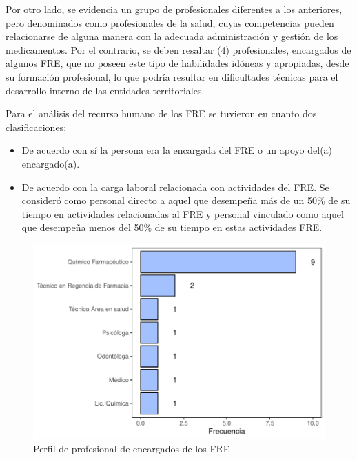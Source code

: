 \documentclass[
]{book}
\begin{document}
Por otro lado, se evidencia un grupo de profesionales diferentes a los anteriores, pero denominados como profesionales de la salud, cuyas competencias pueden relacionarse de alguna manera con la adecuada administración y gestión de los medicamentos. Por el contrario, se deben resaltar (4) profesionales, encargados de algunos FRE, que no poseen este tipo de habilidades idóneas y apropiadas, desde su formación profesional, lo que podría resultar en dificultades técnicas para el desarrollo interno de las entidades territoriales.

Para el análisis del recurso humano de los FRE se tuvieron en cuanto dos clasificaciones:

\begin{itemize}
\item
  De acuerdo con sí la persona era la encargada del FRE o un apoyo del(a) encargado(a).
\item
  De acuerdo con la carga laboral relacionada con actividades del FRE. Se consideró como personal directo a aquel que desempeña más de un 50\% de su tiempo en actividades relacionadas al FRE y personal vinculado como aquel que desempeña menos del 50\% de su tiempo en estas actividades FRE.
\end{itemize}

\begin{figure}

{\centering \includegraphics[width=1\linewidth]{InformeFinal_files/figure-latex/perfilProfesionalEncargado-1} 

}

\caption{Perfil de profesional de encargados de los FRE}\label{fig:perfilProfesionalEncargado}
\end{figure}
\end{document}
